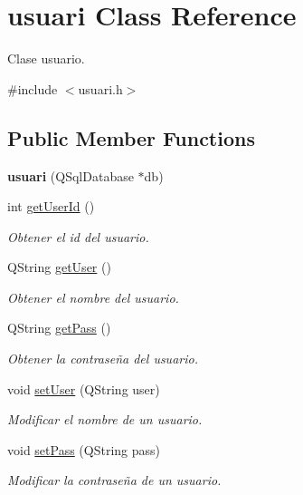 \hypertarget{classusuari}{}\section{usuari Class Reference}
\label{classusuari}


Clase usuario.  




{\ttfamily \#include $<$usuari.\+h$>$}

\subsection*{Public Member Functions}
\begin{DoxyCompactItemize}
\item 
\mbox{\label{classusuari_a3db26e8f6096aeee40d54fd1f02b94e3}} 
{\bfseries usuari} (Q\+Sql\+Database $\ast$db)
\item 
int \mbox{\hyperlink{classusuari_a21ba8ae0a0d63bd1196cd62331573cde}{get\+User\+Id}} ()
\begin{DoxyCompactList}\small\item\em Obtener el id del usuario. \end{DoxyCompactList}\item 
Q\+String \mbox{\hyperlink{classusuari_adbe5be463437f9e51ca6f4370fa54a5b}{get\+User}} ()
\begin{DoxyCompactList}\small\item\em Obtener el nombre del usuario. \end{DoxyCompactList}\item 
Q\+String \mbox{\hyperlink{classusuari_aa8cc58aa9b8a1c8a7ef5fce3ad5fa819}{get\+Pass}} ()
\begin{DoxyCompactList}\small\item\em Obtener la contraseña del usuario. \end{DoxyCompactList}\item 
void \mbox{\hyperlink{classusuari_aa3db9874672456c37ce3651a08654eef}{set\+User}} (Q\+String user)
\begin{DoxyCompactList}\small\item\em Modificar el nombre de un usuario. \end{DoxyCompactList}\item 
void \mbox{\hyperlink{classusuari_a4c275e6e79e42efdae64f748dcabb843}{set\+Pass}} (Q\+String pass)
\begin{DoxyCompactList}\small\item\em Modificar la contraseña de un usuario. \end{DoxyCompactList}\item 

\end{DoxyCompactItemize}
